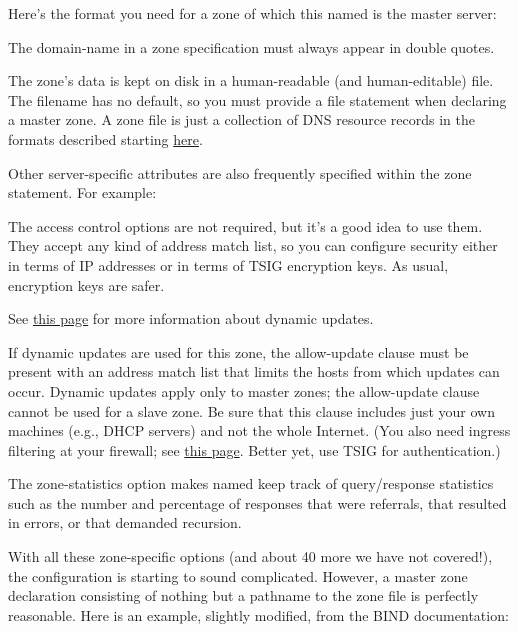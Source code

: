 \protect\hypertarget{part0024_split_044.htmlux5cux23_idIndexMarker2186}{}{}Here's
the format you need for a zone of which this {named} is the master
server:


The {domain-name} in a {zone} specification must always appear in double
quotes.

The zone's data is kept on disk in a human-readable (and human-editable)
file. The filename has no default, so you must provide a {file}
statement when declaring a master zone. A zone file is just a collection
of DNS resource records in the formats described starting
\protect\hyperlink{part0024_split_019.htmlux5cux23_idTextAnchor864}{here}.

Other server-specific attributes are also frequently specified within
the {zone} statement. For example:


The access control options are not required, but it's a good idea to use
them. They accept any kind of address match list, so you can configure
security either in terms of IP addresses or in terms of TSIG encryption
keys. As usual, encryption keys are safer.

\leavevmode\hypertarget{part0024_split_044.htmlux5cux23_idContainer994}{}%
See
\protect\hyperlink{part0024_split_052.htmlux5cux23_idTextAnchor928}{this
page} for more information about dynamic updates.

If dynamic updates are used for this zone, the {allow-update} clause
must be present with an address match list that limits the hosts from
which updates can occur. Dynamic updates apply only to master zones; the
{allow-update} clause cannot be used for a slave zone. Be sure that this
clause includes just your own machines (e.g., DHCP servers) and not the
whole Internet. (You also need ingress filtering at your firewall; see
\protect\hyperlink{part0021_split_066.htmlux5cux23_idTextAnchor726}{this
page}. Better yet, use TSIG for authentication.)

The {zone-statistics} option makes {named} keep track of query/response
statistics such as the number and percentage of responses that were
referrals, that resulted in errors, or that demanded recursion.

With all these zone-specific options (and about 40 more we have not
covered!), the configuration is starting to sound complicated. However,
a master zone declaration consisting of nothing but a pathname to the
zone file is perfectly reasonable. Here is an example, slightly
modified, from the BIND documentation:

